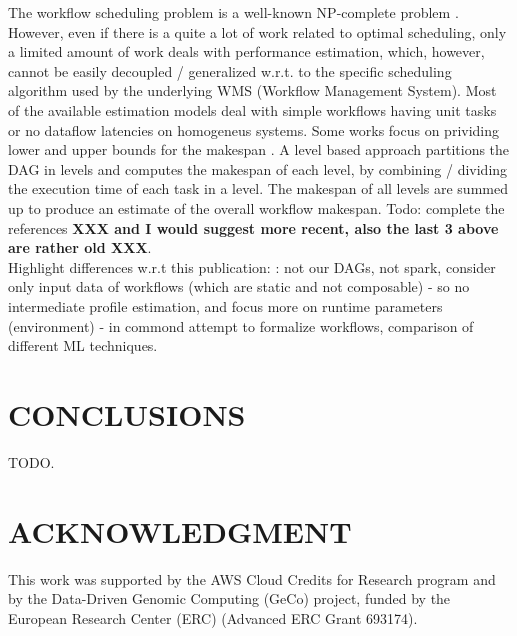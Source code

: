 \documentclass[a4paper, 10pt, conference]{ieeeconf}      %
\begin{document}
The workflow scheduling problem is a well-known NP-complete problem \cite{hartmanis1982computers}. However, even if there is a quite a lot of work related  to optimal scheduling, only a limited amount of work deals with performance estimation, which, however,  cannot be easily decoupled / generalized w.r.t. to the specific scheduling algorithm used by the underlying WMS (Workflow Management System).
Most of the available estimation models deal with simple workflows having unit tasks or no dataflow latencies on homogeneus systems. Some works focus on prividing lower and upper bounds for the makespan \cite{al1990lower, jain1994lower, hu1994improved}. A level based approach partitions the DAG in levels and computes the makespan of each level, by combining / dividing the execution time of each task in a level. The makespan of all levels are summed up to produce an estimate of the overall workflow makespan.
Todo: complete the references \textbf{XXX and I would suggest more recent, also the last 3 above are rather old XXX}. \\

Highlight differences w.r.t this  publication: \cite{pham2017predicting}: not our DAGs, not spark, consider only input data of workflows (which are static and not composable) - so no intermediate profile estimation, and focus more on runtime parameters (environment) - in commond attempt to formalize workflows, comparison of different ML techniques.



\section{CONCLUSIONS}
TODO.


\section*{ACKNOWLEDGMENT}
This work was supported by the AWS Cloud Credits for Research program and by the Data-Driven Genomic Computing (GeCo) project, funded by the European Research Center (ERC) (Advanced ERC Grant 693174).

 
\end{document}
